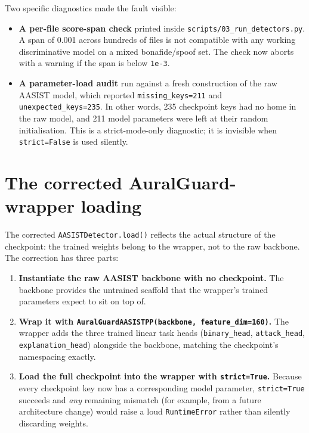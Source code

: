 Two specific diagnostics made the fault visible:

\begin{itemize}
    \item \textbf{A per-file score-span check} printed inside
        \texttt{scripts/03\_run\_detectors.py}. A span of 0.001 across hundreds of
        files is not compatible with any working discriminative model on
        a mixed bonafide/spoof set. The check now aborts with a warning
        if the span is below \texttt{1e-3}.
    \item \textbf{A parameter-load audit} run against a fresh construction of
        the raw AASIST model, which reported \texttt{missing\_keys=211} and
        \texttt{unexpected\_keys=235}. In other words, 235 checkpoint keys had no home
        in the raw model, and 211 model parameters were left at their
        random initialisation. This is a strict-mode-only diagnostic; it
        is invisible when \texttt{strict=False} is used silently.
\end{itemize}


\section{The corrected AuralGuard-wrapper loading}
\label{sec:detector-verification-checkpoint}

The corrected \texttt{AASISTDetector.load()} reflects the actual
structure of the checkpoint: the trained weights belong to the
wrapper, not to the raw backbone. The correction has three parts:

\begin{enumerate}
    \item \textbf{Instantiate the raw AASIST backbone with no checkpoint.} The
        backbone provides the untrained scaffold that the wrapper's
        trained parameters expect to sit on top of.
    \item \textbf{Wrap it with \texttt{AuralGuardAASISTPP(backbone, feature\_dim=160)}.}
        The wrapper adds the three trained linear task heads
        (\texttt{binary\_head}, \texttt{attack\_head}, \texttt{explanation\_head}) alongside the
        backbone, matching the checkpoint's namespacing exactly.
    \item \textbf{Load the full checkpoint into the wrapper with
        \texttt{strict=True}.} Because every checkpoint key now has a
        corresponding model parameter, \texttt{strict=True} succeeds
        and \emph{any} remaining mismatch (for example, from a future
        architecture change) would raise a loud \texttt{RuntimeError}
        rather than silently discarding weights.
\end{enumerate}

